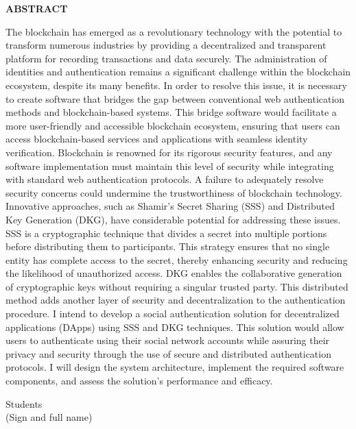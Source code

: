 \documentclass[../Main.tex]{subfiles}
\begin{document}
\begin{center}
    \Large{\textbf{ABSTRACT}}\\
\end{center}
\vspace{1cm}

The blockchain has emerged as a revolutionary technology with the potential to transform numerous industries by providing a decentralized and transparent platform for recording transactions and data securely. The administration of identities and authentication remains a significant challenge within the blockchain ecosystem, despite its many benefits. In order to resolve this issue, it is necessary to create software that bridges the gap between conventional web authentication methods and blockchain-based systems. This bridge software would facilitate a more user-friendly and accessible blockchain ecosystem, ensuring that users can access blockchain-based services and applications with seamless identity verification. Blockchain is renowned for its rigorous security features, and any software implementation must maintain this level of security while integrating with standard web authentication protocols. A failure to adequately resolve security concerns could undermine the trustworthiness of blockchain technology. Innovative approaches, such as Shamir's Secret Sharing (SSS)  and Distributed Key Generation (DKG), have considerable potential for addressing these issues. SSS is a cryptographic technique that divides a secret into multiple portions before distributing them to participants. This strategy ensures that no single entity has complete access to the secret, thereby enhancing security and reducing the likelihood of unauthorized access. DKG enables the collaborative generation of cryptographic keys without requiring a singular trusted party. This distributed method adds another layer of security and decentralization to the authentication procedure. I intend to develop a social authentication solution for decentralized applications (DApps) using SSS and DKG techniques. This solution would allow users to authenticate using their social network accounts while assuring their privacy and security through the use of secure and distributed authentication protocols. I will design the system architecture, implement the required software components, and assess the solution's performance and efficacy.
\begin{flushright}
Students\\
(Sign and full name)
\end{flushright}
\end{document}
